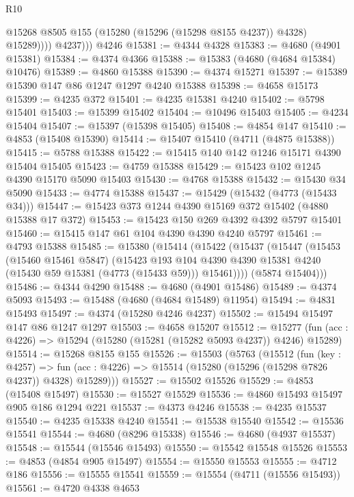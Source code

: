 \begin{lexlean}{R10}
\begin{coremodule}
              @15268 @8505 @155 (@15280 (@15296 (@15298 @8155 @4237)) @4328) @15289))))
          @4237)))
    @4246
@15381 := @4344 @4328
@15383 := @4680 (@4901 @15381)
@15384 := @4374 @4366
@15388 := @15383 (@4680 (@4684 @15384) @10476)
@15389 := @4860 @15388
@15390 := @4374 @15271
@15397 := @15389 @15390 @147 @86 @1247 @1297 @4240 @15388
@15398 := @4658 @15173
@15399 := @4235 @372
@15401 := @4235 @15381 @4240
@15402 := @5798 @15401
@15403 := @15399 @15402
@15404 := @10496 @15403
@15405 := @4234 @15404
@15407 := @15397 (@15398 @15405)
@15408 := @4854 @147
@15410 := @4853 (@15408 @15390)
@15414 := @15407 @15410 (@4711 (@4875 @15388))
@15415 := @5788 @15388
@15422 := @15415 @140 @142 @1246 @15171 @4390 @15404 @15405
@15423 := @4759 @15388
@15429 := @15423 @102 @1245 @4390 @15170 @5090 @15403
@15430 := @4768 @15388
@15432 := @15430 @34 @5090
@15433 := @4774 @15388
@15437 := @15429 (@15432 (@4773 (@15433 @34)))
@15447 := @15423 @373 @1244 @4390 @15169 @372 @15402 (@4880 @15388 @17 @372)
@15453 := @15423 @150 @269 @4392 @4392 @5797 @15401
@15460 := @15415 @147 @61 @104 @4390 @4390 @4240 @5797
@15461 := @4793 @15388
@15485 := @15380
    (@15414
      (@15422
        (@15437
          (@15447
            (@15453
              (@15460 @15461 @5847)
              (@15423
                @193
                @104
                @4390
                @4390
                @15381
                @4240
                (@15430 @59 @15381 (@4773 (@15433 @59)))
                @15461))))
        (@5874 @15404)))
@15486 := @4344 @4290
@15488 := @4680 (@4901 @15486)
@15489 := @4374 @5093
@15493 := @15488 (@4680 (@4684 @15489) @11954)
@15494 := @4831 @15493
@15497 := @4374 (@15280 @4246 @4237)
@15502 := @15494 @15497 @147 @86 @1247 @1297
@15503 := @4658 @15207
@15512 := @15277 (fun (acc : @4226) => @15294 (@15280 (@15281 (@15282 @5093 @4237)) @4246) @15289)
@15514 := @15268 @8155 @155
@15526 := @15503
    (@5763
      (@15512
        (fun (key : @4257) =>
        fun (acc : @4226) => @15514 (@15280 (@15296 (@15298 @7826 @4237)) @4328) @15289)))
@15527 := @15502 @15526
@15529 := @4853 (@15408 @15497)
@15530 := @15527 @15529
@15536 := @4860 @15493 @15497 @905 @186 @1294 @221
@15537 := @4373 @4246
@15538 := @4235 @15537
@15540 := @4235 @15338 @4240
@15541 := @15538 @15540
@15542 := @15536 @15541
@15544 := @4680 (@8296 @15338)
@15546 := @4680 (@4937 @15537)
@15548 := @15544 (@15546 @15493)
@15550 := @15542 @15548 @15526
@15553 := @4853 (@4854 @905 @15497)
@15554 := @15550 @15553
@15555 := @4712 @186
@15556 := @15555 @15541
@15559 := @15554 (@4711 (@15556 @15493))
@15561 := @4720 @4338 @4653

\end{coremodule}
\end{lexlean}
